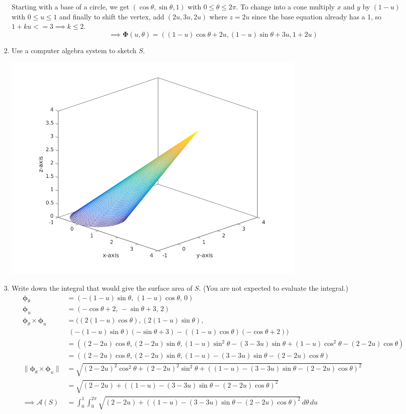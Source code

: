 \documentclass{article}
\newcommand{\norm}[1]{\| #1 \|}
\begin{document}
\begin{enumerate}
\begin{enumerate}
            Starting with a base of a circle, we get $(\cos \theta, \sin \theta, 1)$ with $0 \leq \theta \leq 2\pi$. To change into a cone multiply $x$ and $y$ by $(1-u)$ with $0 \leq u \leq 1$ and finally to shift the vertex, add $(2u, 3u, 2u)$ where $z = 2u$ since the base equation already has a 1, so $1 + ku <= 3 \implies k \leq 2$.
            \[ \implies \boldsymbol \Phi (u,\theta) = ( (1-u)\cos \theta + 2 u, (1-u)\sin \theta + 3u, 1 + 2u) \] 
            \item Use a computer algebra system to sketch $S$.

                \includegraphics[width=0.7\textwidth,center]{b42-a8-2b}
            \item Write down the integral that would give the surface area of $S$. (You are not expected to evaluate the integral.)
            \begin{align*}
                \boldsymbol \phi_\theta &= (-(1-u)\sin \theta,\, (1-u)\cos \theta,\,0) \\
                \boldsymbol \phi_u &= (-\cos \theta + 2,\, -\sin\theta + 3,\,2) \\
                \boldsymbol \phi_\theta \times \boldsymbol \phi_u &= ((2(1-u)\cos \theta),  (2(1-u)\sin \theta),  \\ 
                & \; (-(1-u)\sin \theta)(-\sin \theta + 3) - ((1-u)\cos\theta)(-\cos \theta + 2)) \\
                &= ((2-2u)\cos \theta,  (2-2u)\sin \theta, (1-u)\sin^2 \theta -(3 - 3u)\sin \theta + (1-u)\cos ^2 \theta - (2-2u)\cos \theta) \\
                &= ((2-2u)\cos \theta,  (2-2u)\sin \theta, (1-u)-(3 - 3u)\sin \theta - (2-2u)\cos \theta) \\
                \norm{ \boldsymbol \phi_\theta \times \boldsymbol \phi_u} &= \sqrt{(2-2u)^2\cos^2 \theta +  (2-2u)^2\sin^2 \theta + ((1-u)-(3 - 3u)\sin \theta - (2-2u)\cos \theta)^2} \\
                &= \sqrt{(2-2u)+ ((1-u)-(3 - 3u)\sin \theta - (2-2u)\cos \theta)^2} \\
                \implies \mathcal{A}(S) &= \int_0^1\int_0^{2\pi} \sqrt{(2-2u)+ ((1-u)-(3 - 3u)\sin \theta - (2-2u)\cos \theta)^2}\, d\theta \, du \\
            \end{align*}
        \end{enumerate} 


\end{enumerate}
\end{document}
